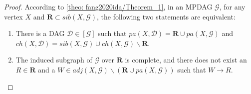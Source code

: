 \documentclass{article}
\begin{document}
\begin{proof}
    According to \cref{theo: fang2020ida/Theorem_1}, in an MPDAG $\mathcal{G}$, for any vertex $X$ and $\mathbf{R} \subset sib(X,\mathcal{G})$, the following two statements are equivalent:
    \begin{enumerate}[leftmargin=6.5mm]
    \itemsep0em
        \item[(1)] There is a DAG $\mathcal{D} \in [\mathcal{G}]$ such that $pa(X,\mathcal{D})=\mathbf{R} \cup pa(X,\mathcal{G})$ and $ch(X,\mathcal{D})=sib(X,\mathcal{G}) \cup ch(X, \mathcal{G}) \backslash \mathbf{R}$.
        \item[(2)] The induced subgraph of $\mathcal{G}$ over $\mathbf{R}$ is complete, and there does not exist an $R \in \mathbf{R}$ and a $W \in {adj(X,\mathcal{G}) \backslash{(\mathbf{R} \cup pa(X,\mathcal{G}))}}$ such that $W \rightarrow R$.
    \end{enumerate}
    
    
    
    

\end{proof}
\end{document}
